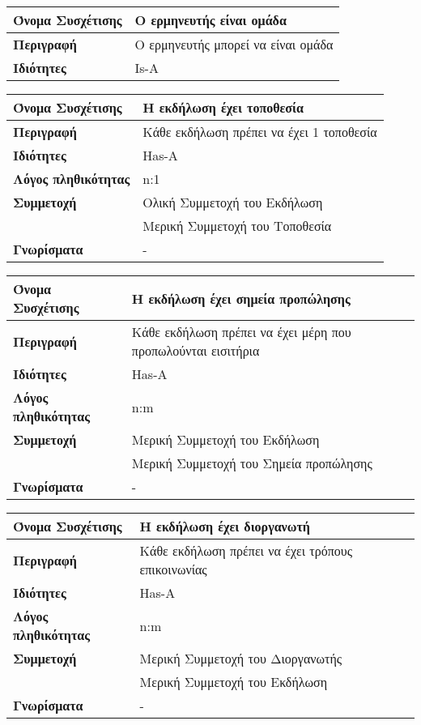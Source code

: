 \begin{center}
\begin{tabular}[]{|p{4cm}|p{10cm}|}
  \hline
  \textbf{Όνομα Συσχέτισης} &Ο ερμηνευτής είναι ομάδα\\ \hline
  \textbf{Περιγραφή} & Ο ερμηνευτής μπορεί να είναι ομάδα\\ \hline
  \textbf{Ιδιότητες} & Is-A  \\ \hline
\end{tabular}
\vspace{0.3 cm}

\begin{tabular}[]{|p{4cm}|p{10cm}|}
  \hline
  \textbf{Όνομα Συσχέτισης} & Η εκδήλωση έχει τοποθεσία\\ \hline
  \textbf{Περιγραφή} & Κάθε εκδήλωση πρέπει να έχει 1 τοποθεσία\\ \hline
  \textbf{Ιδιότητες} & Has-A \\ \hline
  \textbf{Λόγος πληθικότητας} & n:1 \\ \hline
  \textbf{Συμμετοχή} & Ολική Συμμετοχή του Εκδήλωση\\ \cline{2-2}
                     & Μερική Συμμετοχή του Τοποθεσία \\ \hline
  \textbf{Γνωρίσματα} & - \\ \hline
\end{tabular}
\vspace{0.3 cm}


\begin{tabular}[]{|p{4cm}|p{10cm}|}
  \hline
  \textbf{Όνομα Συσχέτισης} & Η εκδήλωση έχει σημεία προπώλησης \\ \hline
  \textbf{Περιγραφή} & Κάθε εκδήλωση πρέπει να έχει μέρη που προπωλούνται εισιτήρια\\ \hline
  \textbf{Ιδιότητες} & Has-A \\ \hline
  \textbf{Λόγος πληθικότητας} & n:m \\ \hline
  \textbf{Συμμετοχή} & Μερική Συμμετοχή του Εκδήλωση \\ \cline{2-2}
                     & Μερική Συμμετοχή του Σημεία προπώλησης\\ \hline
  \textbf{Γνωρίσματα} & - \\ \hline
\end{tabular}
\vspace{0.3 cm}


\begin{tabular}[]{|p{4cm}|p{10cm}|}
  \hline
  \textbf{Όνομα Συσχέτισης} & Η εκδήλωση έχει διοργανωτή \\  \hline
  \textbf{Περιγραφή} & Κάθε εκδήλωση πρέπει να έχει τρόπους επικοινωνίας\\ \hline
  \textbf{Ιδιότητες} & Has-A \\ \hline
  \textbf{Λόγος πληθικότητας} & n:m \\ \hline
  \textbf{Συμμετοχή} & Mερική Συμμετοχή του Διοργανωτής \\ \cline{2-2}
                     & Μερική Συμμετοχή του Εκδήλωση \\ \hline
  \textbf{Γνωρίσματα} & - \\ \hline
\end{tabular}
\vspace{0.3 cm}


\end{center}
